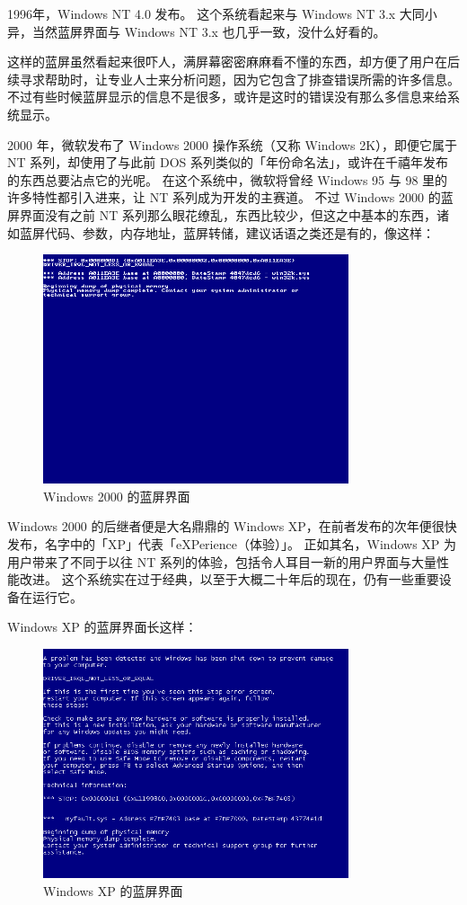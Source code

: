 1996年，Windows NT 4.0 发布。
这个系统看起来与 Windows NT 3.x 大同小异，当然蓝屏界面与 Windows NT 3.x 也几乎一致，没什么好看的。

这样的蓝屏虽然看起来很吓人，满屏幕密密麻麻看不懂的东西，却方便了用户在后续寻求帮助时，让专业人士来分析问题，因为它包含了排查错误所需的许多信息。
不过有些时候蓝屏显示的信息不是很多，或许是这时的错误没有那么多信息来给系统显示。

2000 年，微软发布了 Windows 2000 操作系统（又称 Windows 2K），即便它属于 NT 系列，却使用了与此前 DOS 系列类似的「年份命名法」，或许在千禧年发布的东西总要沾点它的光呢。
在这个系统中，微软将曾经 Windows 95 与 98 里的许多特性都引入进来，让 NT 系列成为开发的主赛道。
不过 Windows 2000 的蓝屏界面没有之前 NT 系列那么眼花缭乱，东西比较少，但这之中基本的东西，诸如蓝屏代码、参数，内存地址，蓝屏转储，建议话语之类还是有的，像这样：

\begin{figure}[htb!]
  \centering
  \includegraphics[width=9cm]{assets/Win-2K-BSoD.png}
  \caption{Windows 2000 的蓝屏界面}
  \label{Win-2K-BSoD}
\end{figure}

Windows 2000 的后继者便是大名鼎鼎的 Windows XP，在前者发布的次年便很快发布，名字中的「XP」代表「eXPerience（体验）」。
正如其名，Windows XP 为用户带来了不同于以往 NT 系列的体验，包括令人耳目一新的用户界面与大量性能改进。
这个系统实在过于经典，以至于大概二十年后的现在，仍有一些重要设备在运行它。

Windows XP 的蓝屏界面长这样：

\begin{figure}[htb!]
  \centering
  \includegraphics[width=9cm]{assets/Win-XP-BSoD.png}
  \caption{Windows XP 的蓝屏界面}
  \label{Win-XP-BSoD}
\end{figure}

